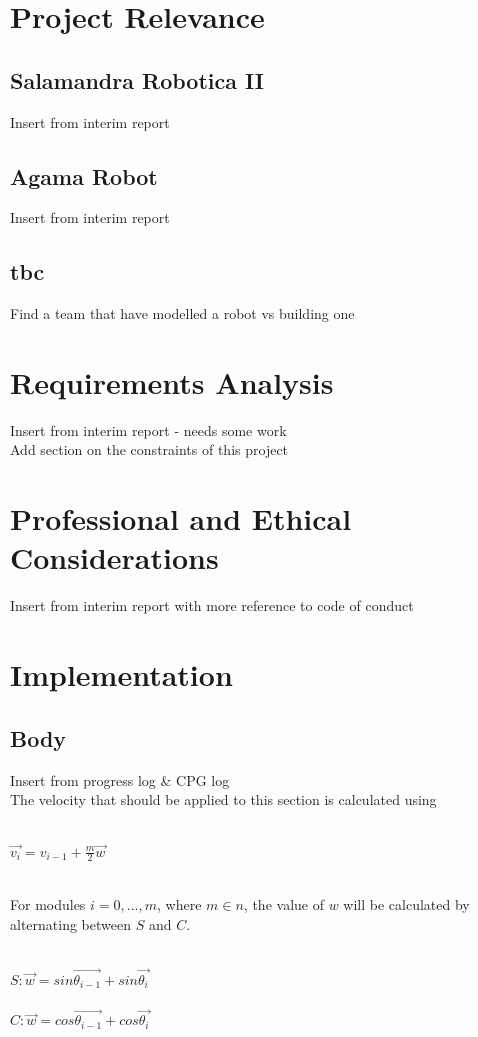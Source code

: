 \documentclass{article}
\begin{document}
\newpage
\section{Project Relevance}
\subsection{Salamandra Robotica II}
Insert from interim report
\subsection{Agama Robot}
Insert from interim report
\subsection{tbc}
Find a team that have modelled a robot vs building one

\newpage
\section{Requirements Analysis}
Insert from interim report - needs some work\\
Add section on the constraints of this project

\newpage
\section{Professional and Ethical Considerations}
Insert from interim report with more reference to code of conduct

\newpage
\section{Implementation}
\subsection{Body}
Insert from progress log \& CPG log\\
The velocity that should be applied to this section is calculated using\\\\
\begin{Large}
$\overrightarrow{v_{i}} = v_{i-1} + \frac{m}{2}\overrightarrow{w} $\\\\
\end{Large}
For modules $i = 0, ..., m$, where $m \in n$, the value of $w$ will be calculated by alternating between $S$ and $C$.\\\\
\begin{Large}
$S: \overrightarrow{w} = sin\overrightarrow{\theta_{i-1}} + sin\overrightarrow{\theta_{i}}$\\\\
$C: \overrightarrow{w} = cos\overrightarrow{\theta_{i-1}} + cos\overrightarrow{\theta_{i}}$\\\\
\end{Large}
\end{document}
